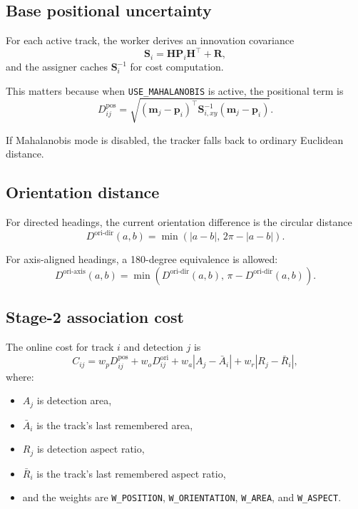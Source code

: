 \documentclass[11pt]{article}
\newcommand{\runtimekey}[1]{\texttt{#1}}
\begin{document}
\subsection{Base positional uncertainty}

For each active track, the worker derives an innovation covariance
\begin{equation}
  \mathbf{S}_i = \mathbf{H}\mathbf{P}_i\mathbf{H}^\top + \mathbf{R},
\end{equation}
and the assigner caches $\mathbf{S}_i^{-1}$ for cost computation.

This matters because when \runtimekey{USE\_MAHALANOBIS} is active, the positional term is
\begin{equation}
  D^{\text{pos}}_{ij} =
  \sqrt{
    (\mathbf{m}_j - \mathbf{p}_i)^\top
    \mathbf{S}_{i,xy}^{-1}
    (\mathbf{m}_j - \mathbf{p}_i)
  }.
\end{equation}

If Mahalanobis mode is disabled, the tracker falls back to ordinary Euclidean distance.

\subsection{Orientation distance}

For directed headings, the current orientation difference is the circular distance
\begin{equation}
  D^{\text{ori-dir}}(a,b) = \min\left(|a-b|,\, 2\pi - |a-b|\right).
\end{equation}

For axis-aligned headings, a 180-degree equivalence is allowed:
\begin{equation}
  D^{\text{ori-axis}}(a,b) =
  \min\left(D^{\text{ori-dir}}(a,b),\, \pi - D^{\text{ori-dir}}(a,b)\right).
\end{equation}

\subsection{Stage-2 association cost}

The online cost for track $i$ and detection $j$ is
\begin{equation}
  C_{ij} =
  w_p D^{\text{pos}}_{ij}
  + w_o D^{\text{ori}}_{ij}
  + w_a \left|A_j - \bar{A}_i\right|
  + w_r \left|R_j - \bar{R}_i\right|,
\end{equation}
where:

\begin{itemize}
  \item $A_j$ is detection area,
  \item $\bar{A}_i$ is the track's last remembered area,
  \item $R_j$ is detection aspect ratio,
  \item $\bar{R}_i$ is the track's last remembered aspect ratio,
  \item and the weights are \runtimekey{W\_POSITION}, \runtimekey{W\_ORIENTATION}, \runtimekey{W\_AREA}, and \runtimekey{W\_ASPECT}.
\end{itemize}
\end{document}
